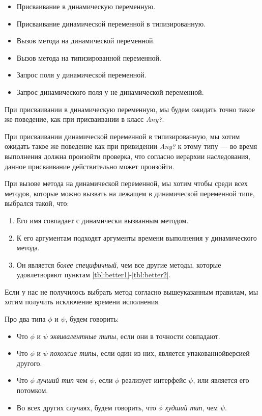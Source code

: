 \begin{itemize}
    \item Присваивание в динамическую переменную.
    \item Присваивание динамической переменной в типизированную.
    \item Вызов метода на динамической переменной.
    \item Вызов метода на типизированной переменной.
    \item Запрос поля у динамической переменной.
    \item Запрос динамического поля у не динамической переменной.
\end{itemize}

При присваивании в динамическую переменную, мы будем ожидать точно такое же поведение, как при присваивании в класс \textit{Any?}.

При присваивании динамической переменной в типизированную, мы хотим ожидать такое же поведение как при привидении \textit{Any?} к этому типу --- во время выполнения должна произойти проверка, что согласно иерархии наследования, данное присваивание действительно может произойти.%

При вызове метода на динамической переменной, мы хотим чтобы среди всех методов, которые можно вызвать на лежащем в динамической переменной типе, выбрался такой, что:
\begin{enumerate}
    \item Его имя совпадает с динамически вызванным методом. \label{tbl:better1}
    \item К его аргументам подходят аргументы времени выполнения у динамического метода. \label{tbl:better2}
    \item Он является \textit{более специфичный}, чем все другие методы, которые удовлетворяют пунктам \ref{tbl:better1}-\ref{tbl:better2}.
\end{enumerate}

Если у нас не получилось выбрать метод согласно вышеуказанным правилам, мы хотим получить исключение времени исполнения.

Про два типа $\phi$ и $\psi$, будем говорить:
\begin{itemize}
    \item Что $\phi$ и $\psi$ \textit{эквивалентные типы}, если они в точности совпадают.
    \item Что $\phi$ и $\psi$ \textit{похожие типы}, если один из них, является упакованной\footnotemark  версией другого.
    \item Что $\phi$ \textit{лучший тип} чем  $\psi$, если $\phi$ реализует интерфейс $\psi$, или является его потомком.
    \item Во всех других случаях, будем говорить, что $\phi$ \textit{худший тип}, чем $\psi$.
\end{itemize}

